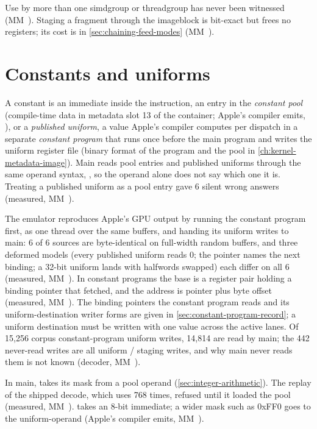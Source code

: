 Use by more than one simdgroup or threadgroup has never been witnessed (MM~). Staging a
fragment through the imageblock is bit-exact but frees no registers; its cost is in \cref{sec:chaining-feed-modes} (MM~).

\section{Constants and uniforms}\label{sec:constants-uniforms}

A constant is an immediate inside the instruction, an entry in the \emph{constant pool}
(compile-time data in metadata slot 13 of the container; Apple's compiler emits, ), or a
\emph{published uniform}, a value Apple's compiler computes per dispatch in a separate \emph{constant program} that runs once before the main
program and writes the uniform register file (binary format of the program and the pool in \cref{ch:kernel-metadata-image}). Main reads pool entries and published uniforms through the same operand
syntax, , so the operand alone does not say which one it is. Treating a published uniform as a
pool entry gave 6 silent wrong answers (measured, MM~).

The emulator reproduces Apple's GPU output by running the constant program first, as one thread over the same buffers,
and handing its uniform writes to main: 6 of 6 sources are byte-identical on full-width random buffers, and three deformed
models (every published uniform reads 0; the pointer names the next binding; a 32-bit uniform lands with halfwords
swapped) each differ on all 6 (measured, MM~). In constant programs the base is a register pair holding a
binding pointer that  fetched, and the address is pointer plus byte offset (measured, MM~). The
binding pointers the constant program reads and its
uniform-destination writer forms are given in \cref{sec:constant-program-record}; a uniform destination must be written
with one value across the active lanes. Of 15,256 corpus constant-program uniform writes, 14,814 are read by main; the
442 never-read writes are all uniform / staging writes, and why main never reads them is not known (decoder, MM~).

In main,  takes its mask from a pool operand (\cref{sec:integer-arithmetic}). The replay of the shipped
decode, which uses  768 times, refused until it loaded the pool (measured, MM~).  takes an 8-bit immediate; a wider mask such as 0xFF0 goes to the
uniform-operand  (Apple's compiler emits, MM~).

